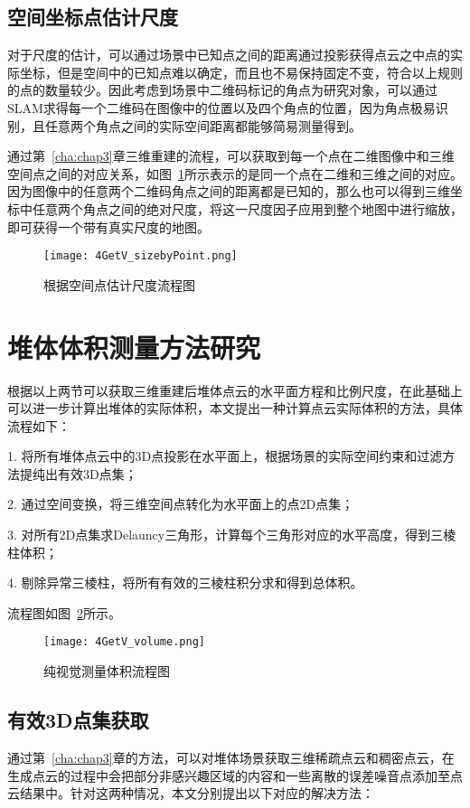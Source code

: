 \subsection{空间坐标点估计尺度}
对于尺度的估计，可以通过场景中已知点之间的距离通过投影获得点云之中点的实际坐标，但是空间中的已知点难以确定，而且也不易保持固定不变，符合以上规则的点的数量较少。因此考虑到场景中二维码标记的角点为研究对象，可以通过SLAM求得每一个二维码在图像中的位置以及四个角点的位置，因为角点极易识别，且任意两个角点之间的实际空间距离都能够简易测量得到。

通过第~\ref{cha:chap3}章三维重建的流程，可以获取到每一个点在二维图像中和三维空间点之间的对应关系，如图~\ref{fig:4GetV_sizebyPoint}所示表示的是同一个点在二维和三维之间的对应。因为图像中的任意两个二维码角点之间的距离都是已知的，那么也可以得到三维坐标中任意两个角点之间的绝对尺度，将这一尺度因子应用到整个地图中进行缩放，即可获得一个带有真实尺度的地图。
\begin{figure}[h] %
  \centering
  \texttt{[image: 4GetV\_sizebyPoint.png]}
  \caption{根据空间点估计尺度流程图}
  \label{fig:4GetV_sizebyPoint}
\end{figure}
\section{堆体体积测量方法研究}
\label{sec:4.4}
根据以上两节可以获取三维重建后堆体点云的水平面方程和比例尺度，在此基础上可以进一步计算出堆体的实际体积，本文提出一种计算点云实际体积的方法，具体流程如下：

1. 将所有堆体点云中的3D点投影在水平面上，根据场景的实际空间约束和过滤方法提纯出有效3D点集；

2. 通过空间变换，将三维空间点转化为水平面上的点2D点集；

3. 对所有2D点集求Delauncy三角形，计算每个三角形对应的水平高度，得到三棱柱体积；

4. 剔除异常三棱柱，将所有有效的三棱柱积分求和得到总体积。

流程图如图~\ref{fig:4GetV_volume}所示。
\begin{figure}[h] %
  \centering
  \texttt{[image: 4GetV\_volume.png]}
  \caption{纯视觉测量体积流程图}
  \label{fig:4GetV_volume}
\end{figure}
\subsection{有效3D点集获取}
\label{sec:4.4.1}
通过第~\ref{cha:chap3}章的方法，可以对堆体场景获取三维稀疏点云和稠密点云，在生成点云的过程中会把部分非感兴趣区域的内容和一些离散的误差噪音点添加至点云结果中。针对这两种情况，本文分别提出以下对应的解决方法：


